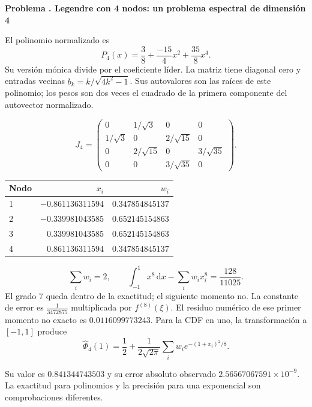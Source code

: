 \documentclass[11pt,a4paper]{article}
\newcommand{\dd}{\,\mathrm d}
\theoremstyle{definition}
\newcounter{problema}
\newenvironment{resuelto}[1]{\refstepcounter{problema}\par\medskip\Needspace{6\baselineskip}\textbf{Problema \theproblema. #1}\par}{\par\medskip}
\begin{document}
\begin{resuelto}{Legendre con 4 nodos: un problema espectral de dimensión 4}
El polinomio normalizado es
\[
P_{4}(x)=\frac{3}{8}+\frac{-15}{4}x^{2}+\frac{35}{8}x^{4}.
\]
Su versión mónica divide por el coeficiente líder. La matriz tiene diagonal cero y entradas vecinas $b_k=k/\sqrt{4k^2-1}$. Sus autovalores son las raíces de este polinomio; los pesos son dos veces el cuadrado de la primera componente del autovector normalizado.

\[J_{4}=\begin{pmatrix}0&1/\sqrt{3}&0&0\\1/\sqrt{3}&0&2/\sqrt{15}&0\\0&2/\sqrt{15}&0&3/\sqrt{35}\\0&0&3/\sqrt{35}&0\end{pmatrix}.\]
\begin{center}\small\begin{tabular}{lrr}
\toprule
Nodo & $x_i$ & $w_i$\\\midrule
1 & $-0.861136311594$ & $0.347854845137$\\
2 & $-0.339981043585$ & $0.652145154863$\\
3 & $0.339981043585$ & $0.652145154863$\\
4 & $0.861136311594$ & $0.347854845137$\\
\bottomrule\end{tabular}\end{center}

\[
\sum_iw_i=2,\qquad
\int_{-1}^1x^{8}\dd x-\sum_iw_ix_i^{8}
=\frac{128}{11025}.
\]
El grado $7$ queda dentro de la exactitud; el siguiente momento no. La constante de error es $\frac{1}{3472875}$ multiplicada por $f^{(8)}(\xi)$. El residuo numérico de ese primer momento no exacto es $0.0116099773243$.
Para la CDF en uno, la transformación a $[-1,1]$ produce
\[
\widehat\Phi_{4}(1)=\frac12+
\frac1{2\sqrt{2\pi}}\sum_iw_i e^{-(1+x_i)^2/8}.
\]

Su valor es $0.841344743503$ y su error absoluto observado $2.56567067591\times10^{-9}$. La exactitud para polinomios y la precisión para una exponencial son comprobaciones diferentes.\end{resuelto}
\end{document}
